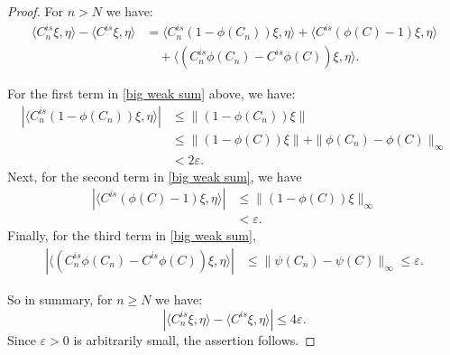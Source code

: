 \begin{proof}
        For $n > N$ we have:
        \begin{align}
            \langle C_n^{is}\xi,\eta\rangle-\langle C^{is}\xi,\eta\rangle &= \langle C_n^{is}(1-\phi(C_n))\xi,\eta\rangle+\langle C^{is}(\phi(C)-1)\xi,\eta\rangle\nonumber\\
                                                                          &\quad +\langle (C_n^{is}\phi(C_n)-C^{is}\phi(C))\xi,\eta\rangle\label{big weak sum}.
        \end{align}
        
        For the first term in \eqref{big weak sum} above, we have:
        \begin{align*}
            |\langle C_n^{is}(1-\phi(C_n))\xi,\eta\rangle| &\leq \|(1-\phi(C_n))\xi\|\\
                                                           &\leq \|(1-\phi(C))\xi\|+\|\phi(C_n)-\phi(C)\|_{\infty}\\
                                                           &< 2\varepsilon.
        \end{align*}
        Next, for the second term in \eqref{big weak sum}, we have
        \begin{align*}
            |\langle C^{is}(\phi(C)-1)\xi,\eta\rangle| &\leq \|(1-\phi(C))\xi\|_\infty\\
                                                       &< \varepsilon.
        \end{align*}
        Finally, for the third term in \eqref{big weak sum},
        \begin{align*}
            |\langle (C_n^{is}\phi(C_n)-C^{is}\phi(C))\xi,\eta\rangle| &\leq \|\psi(C_n)-\psi(C)\|_\infty\leq \varepsilon.
        \end{align*}
        
        So in summary, for $n\geq N$ we have:
        $$|\langle C_n^{is}\xi,\eta\rangle-\langle C^{is}\xi,\eta\rangle|\leq 4\varepsilon.$$
        Since $\varepsilon>0$ is arbitrarily small, the assertion follows.
    \end{proof}

